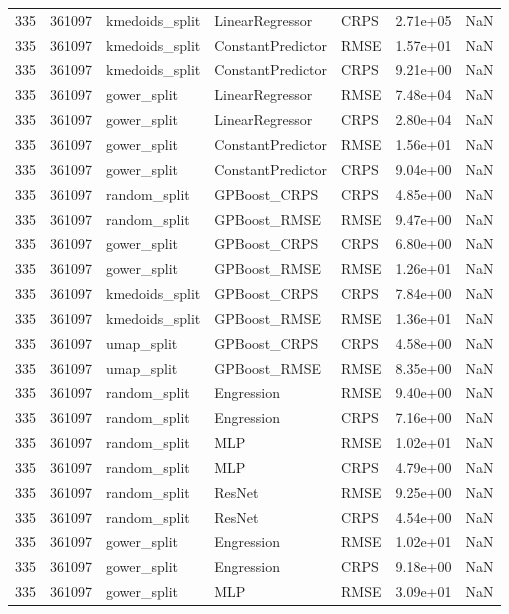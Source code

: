 \begin{tabular}{rrlllrr}
335 & 361097 & kmedoids\_split & LinearRegressor & CRPS & 2.71e+05 & NaN \\
335 & 361097 & kmedoids\_split & ConstantPredictor & RMSE & 1.57e+01 & NaN \\
335 & 361097 & kmedoids\_split & ConstantPredictor & CRPS & 9.21e+00 & NaN \\
335 & 361097 & gower\_split & LinearRegressor & RMSE & 7.48e+04 & NaN \\
335 & 361097 & gower\_split & LinearRegressor & CRPS & 2.80e+04 & NaN \\
335 & 361097 & gower\_split & ConstantPredictor & RMSE & 1.56e+01 & NaN \\
335 & 361097 & gower\_split & ConstantPredictor & CRPS & 9.04e+00 & NaN \\
335 & 361097 & random\_split & GPBoost\_CRPS & CRPS & 4.85e+00 & NaN \\
335 & 361097 & random\_split & GPBoost\_RMSE & RMSE & 9.47e+00 & NaN \\
335 & 361097 & gower\_split & GPBoost\_CRPS & CRPS & 6.80e+00 & NaN \\
335 & 361097 & gower\_split & GPBoost\_RMSE & RMSE & 1.26e+01 & NaN \\
335 & 361097 & kmedoids\_split & GPBoost\_CRPS & CRPS & 7.84e+00 & NaN \\
335 & 361097 & kmedoids\_split & GPBoost\_RMSE & RMSE & 1.36e+01 & NaN \\
335 & 361097 & umap\_split & GPBoost\_CRPS & CRPS & 4.58e+00 & NaN \\
335 & 361097 & umap\_split & GPBoost\_RMSE & RMSE & 8.35e+00 & NaN \\
335 & 361097 & random\_split & Engression & RMSE & 9.40e+00 & NaN \\
335 & 361097 & random\_split & Engression & CRPS & 7.16e+00 & NaN \\
335 & 361097 & random\_split & MLP & RMSE & 1.02e+01 & NaN \\
335 & 361097 & random\_split & MLP & CRPS & 4.79e+00 & NaN \\
335 & 361097 & random\_split & ResNet & RMSE & 9.25e+00 & NaN \\
335 & 361097 & random\_split & ResNet & CRPS & 4.54e+00 & NaN \\
335 & 361097 & gower\_split & Engression & RMSE & 1.02e+01 & NaN \\
335 & 361097 & gower\_split & Engression & CRPS & 9.18e+00 & NaN \\
335 & 361097 & gower\_split & MLP & RMSE & 3.09e+01 & NaN \\

\end{tabular}
